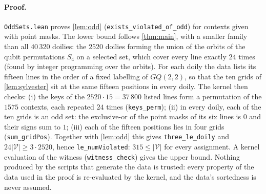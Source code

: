 \documentclass[11pt]{article}
\theoremstyle{definition}
\theoremstyle{remark}
\begin{document}
\paragraph{Proof.}
\texttt{OddSets.lean} proves \cref{lem:odd} (\texttt{exists\_violated\_of\_odd}) for contexts given with point masks.
The lower bound follows \cref{thm:main}, with a smaller family than all $40\,320$ doilies: the $2520$ doilies forming the union of the orbits of the qubit permutations $S_4$ on a selected set, which cover every line exactly $24$ times (found by integer programming over the orbits).
For each doily the data lists its fifteen lines in the order of a fixed labelling of $GQ(2,2)$, so that the ten grids of \cref{lem:sylvester} sit at the same fifteen positions in every doily.
The kernel then checks:
(i) the keys of the $2520\cdot15=37\,800$ listed lines form a permutation of the $1575$ contexts, each repeated $24$ times (\texttt{keys\_perm});
(ii) in every doily, each of the ten grids is an odd set: the exclusive-or of the point masks of its six lines is $0$ and their signs sum to $1$;
(iii) each of the fifteen positions lies in four grids (\texttt{sum\_gridPos}).
Together with \cref{lem:odd} this gives \texttt{three\_le\_doily} and $24|\mathcal V|\ge3\cdot2520$, hence \texttt{le\_numViolated}: $315\le|\mathcal V|$ for every assignment. A kernel evaluation of the witness (\texttt{witness\_check}) gives the upper bound.
Nothing produced by the scripts that generate the data is trusted: every property of the data used in the proof is re-evaluated by the kernel, and the data's sortedness is never assumed.
\end{document}
